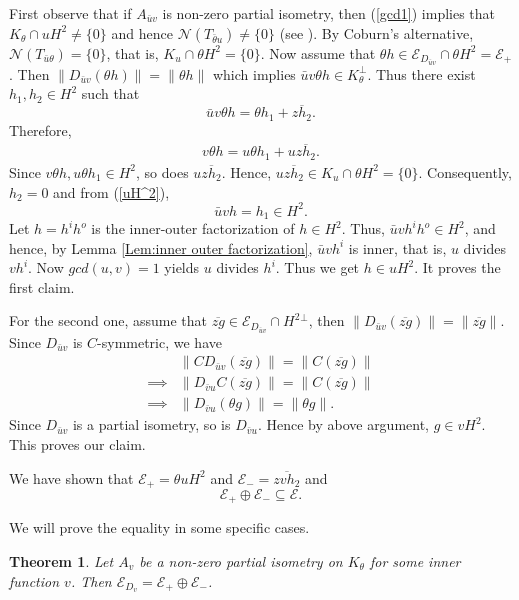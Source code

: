 \documentclass[12pt]{amsart}
\newcommand{\cle}{\mathcal{E}}
\newcommand{\cln}{\mathcal{N}}
\newcommand{\h}{{H}^2}
\theoremstyle{definition}
\theoremstyle{plain}
\newtheorem{thm}{Theorem}[section]
\theoremstyle{definition}
\numberwithin{equation}{section}
\begin{document}
	
First observe that if $A_{\bar{u}v}$ is non-zero partial isometry, then (\ref{gcd1}) implies that $K_\theta \cap u\h \neq \{0\}$ and hence $\cln(T_{\bar{\theta}u}) \neq \{0\}$ (see \cite{XY}). By Coburn's alternative, $\cln(T_{\bar{u}\theta})=\{0\}$, that is, $K_u \cap \theta \h=\{0\}$. Now assume that $\theta h \in \cle_{D_{\bar{u}v}} \cap \theta \h =\cle_+$. Then $\|D_{\bar{u}v}(\theta h)\|=\|\theta h\|$ which implies $\bar{u}v \theta h \in K_\theta^\perp$. Thus there exist $h_1, h_2 \in \h$ such that
\[
\bar{u}v\theta h=\theta h_1 +\overline{zh_2}.
\]
Therefore,
\begin{align}\label{uH^2}
v\theta h =u\theta h_1 +u\overline{zh_2}.
\end{align}
Since $v\theta h, u\theta h_1 \in \h$, so does $u\overline{zh_2}$. Hence, $u\overline{zh_2} \in K_u \cap \theta \h =\{0\}$. Consequently, $h_2=0$ and from (\ref{uH^2}), 
\[
\bar{u}v h=h_1 \in \h.
\]
Let $h=h^{i}h^{o}$ is the inner-outer factorization of $h \in \h$. Thus, 
$\bar{u}vh^{i}h^{o} \in \h$, and hence, by Lemma \ref{Lem:inner outer factorization}, $\bar{u}vh^{i}$ is inner, that is, $u$ divides $vh^{i}$. Now $gcd(u,v)=1$ yields $u$ divides $h^{i}$. Thus we get $h \in u\h$. It proves the first claim. 

For the second one, assume that $\overline{zg}\in \cle_{D_{\bar{u}v}} \cap \h{}^\perp$, then $\|D_{\bar{u}v} {(\overline{zg})}\|=\|\overline{zg}\|$. Since $D_{\bar{u}v}$ is $C$-symmetric, we have
\begin{align*}
		&\|CD_{\bar{u}v} {(\overline{zg})}\|=\|C(\overline{zg})\|\\
		\implies & \|D_{\bar{v}u} C(\overline{zg})\|=\|C(\overline{zg})\|\\
		\implies & \|D_{\bar{v}u} {(\theta g)}\|=\|\theta g\|.	
\end{align*} 
Since $D_{\bar{u}v}$ is a partial isometry, so is $D_{\bar{v}u}$. Hence by above argument, $g \in v\h$. This proves our claim.
	
	
We have shown that $\cle_{+}=\theta uH^2$ and $\cle_{-}=\overline{z v h_2}$ and 
	\[
	\cle_{+} \oplus \cle_{-} \subseteq \cle.
	\]
	

We will prove the equality in some specific cases.
	


\begin{thm}\label{NP}
Let $A_v$ be a non-zero partial isometry on $K_{\theta}$ for some inner function $v$. Then $\cle_{D_{v}}=\cle_{+} \oplus \cle_{-}$.
\end{thm}
	
\end{document}
